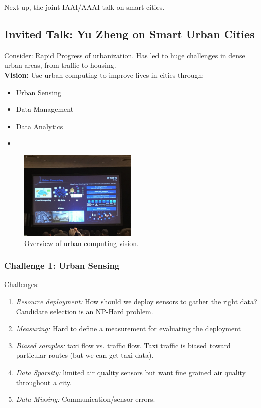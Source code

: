 Next up, the joint IAAI/AAAI talk on smart cities.

\subsection{Invited Talk: Yu Zheng on Smart Urban Cities}

Consider: Rapid Progress of urbanization. Has led to huge challenges in dense urban areas, from traffic to housing. \\

{\bf Vision:} Use urban computing to improve lives in cities through:
\begin{itemize}
    \item Urban Sensing
    \item Data Management
    \item Data Analytics
    \item 
\end{itemize}

\begin{figure}[h!]
    \centering
    \includegraphics[width=0.5\textwidth]{images/urban.JPG}
    \caption{Overview of urban computing vision.}
    \label{fig:urban}
\end{figure}



\subsubsection{Challenge 1: Urban Sensing}

Challenges:
\begin{enumerate}
    \item {\it Resource deployment:} How should we deploy sensors to gather the right data? Candidate selection is an NP-Hard problem.
    \item {\it Measuring:} Hard to define a measurement for evaluating the deployment
    \item {\it Biased samples:} taxi flow vs. traffic flow. Taxi traffic is biased toward particular routes (but we can get taxi data).
    \item {\it Data Sparsity:} limited air quality sensors but want fine grained air quality throughout a city.
    \item {\it Data Missing:} Communication/sensor errors.
\end{enumerate}

